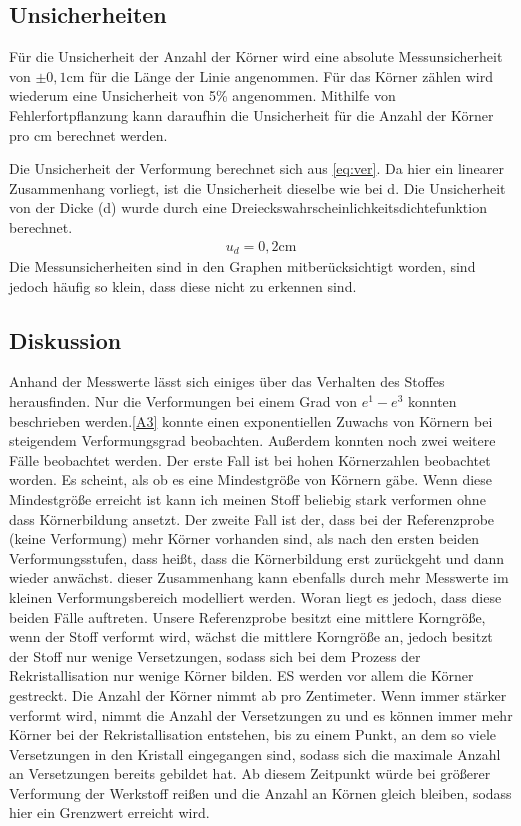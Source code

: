 \documentclass[
	a4paper,
	12pt,
	pagesize,
	ngerman
]{scrartcl}
\begin{document}
\subsection{Unsicherheiten}
Für die Unsicherheit der Anzahl der Körner wird eine absolute Messunsicherheit von $\pm 0,1$cm für die Länge der Linie angenommen. Für das Körner zählen wird wiederum eine Unsicherheit von 5\% angenommen. Mithilfe von Fehlerfortpflanzung kann daraufhin die Unsicherheit für die Anzahl der Körner pro cm berechnet werden.

Die Unsicherheit der Verformung berechnet sich aus \cref{eq:ver}.
Da hier ein linearer Zusammenhang vorliegt, ist die Unsicherheit dieselbe wie bei d. Die Unsicherheit von der Dicke (d) wurde durch eine Dreieckswahrscheinlichkeitsdichtefunktion berechnet.
\begin{align*}
    u_d = 0,2\text{cm}
\end{align*}
Die Messunsicherheiten sind in den Graphen mitberücksichtigt worden, sind jedoch häufig so klein, dass diese nicht zu erkennen sind.


\subsection{Diskussion}
Anhand der Messwerte lässt sich einiges über das Verhalten des Stoffes herausfinden. Nur die Verformungen bei einem Grad von $e^1-e^3$ konnten beschrieben werden.\cref{A3} konnte einen exponentiellen Zuwachs von Körnern bei steigendem Verformungsgrad beobachten. Außerdem konnten noch zwei weitere Fälle beobachtet werden. Der erste Fall ist bei hohen Körnerzahlen beobachtet worden. Es scheint, als ob es eine Mindestgröße von Körnern gäbe. Wenn diese Mindestgröße erreicht ist kann ich meinen Stoff beliebig stark verformen ohne dass Körnerbildung ansetzt. Der zweite Fall ist der, dass bei der Referenzprobe (keine Verformung) mehr Körner vorhanden sind, als nach den ersten beiden Verformungsstufen, dass heißt, dass die Körnerbildung erst zurückgeht und dann wieder anwächst. dieser Zusammenhang kann ebenfalls durch mehr Messwerte im kleinen Verformungsbereich modelliert werden. Woran liegt es jedoch, dass diese beiden Fälle auftreten. Unsere Referenzprobe besitzt eine mittlere Korngröße, wenn der Stoff verformt wird, wächst die mittlere Korngröße an, jedoch besitzt der Stoff nur wenige Versetzungen, sodass sich bei dem Prozess der Rekristallisation nur wenige Körner bilden. ES werden vor allem die Körner gestreckt. Die Anzahl der Körner nimmt ab pro Zentimeter. Wenn immer stärker verformt wird, nimmt die Anzahl der Versetzungen zu und es können immer mehr Körner bei der Rekristallisation entstehen, bis zu einem Punkt, an dem so viele Versetzungen in den Kristall eingegangen sind, sodass sich die maximale Anzahl an Versetzungen bereits gebildet hat. Ab diesem Zeitpunkt würde bei größerer Verformung der Werkstoff reißen und die Anzahl an Körnen gleich bleiben, sodass hier ein Grenzwert erreicht wird.
\end{document}
